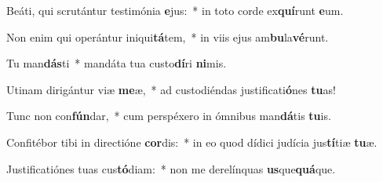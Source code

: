 \item Beáti, qui scrutántur testimónia \textbf{e}jus:~* in toto corde ex\textbf{quí}runt \textbf{e}um.
\item Non enim qui operántur iniqui\textbf{tá}tem,~* in viis ejus am\textbf{bu}la\textbf{vé}runt.
\item Tu man\textbf{dás}ti~* mandáta tua custo\textbf{dí}ri \textbf{ni}mis.
\item Utinam dirigántur viæ \textbf{me}æ,~* ad custodiéndas justificati\textbf{ó}nes \textbf{tu}as!
\item Tunc non con\textbf{fún}dar,~* cum perspéxero in ómnibus man\textbf{dá}tis \textbf{tu}is.
\item Confitébor tibi in directióne \textbf{cor}dis:~* in eo quod dídici judícia jus\textbf{tí}tiæ \textbf{tu}æ.
\item Justificatiónes tuas cus\textbf{tó}diam:~* non me derelínquas \textbf{us}que\textbf{quá}que.

